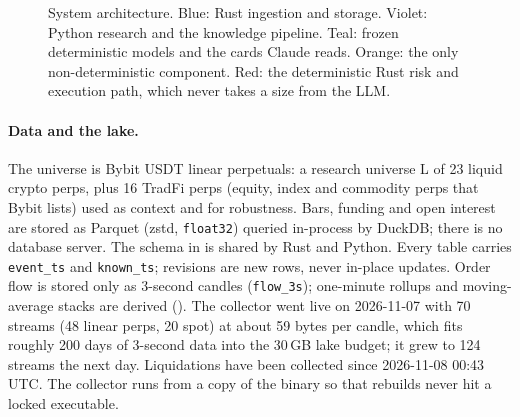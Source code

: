 \documentclass[10pt,a4paper]{article}
\begin{document}
\begin{figure}[t]
\caption{System architecture. Blue: Rust ingestion and storage. Violet: Python research and the knowledge pipeline. Teal: frozen deterministic models and the cards Claude reads. Orange: the only non-deterministic component. Red: the deterministic Rust risk and execution path, which never takes a size from the LLM.}
\label{fig:arch}
\end{figure}

\paragraph{Data and the lake.} The universe is Bybit USDT linear perpetuals: a research universe L of 23 liquid crypto perps, plus 16 TradFi perps (equity, index and commodity perps that Bybit lists) used as context and for robustness. Bars, funding and open interest are stored as Parquet (zstd, \texttt{float32}) queried in-process by DuckDB; there is no database server. The schema in \protect{} is shared by Rust and Python. Every table carries \texttt{event\_ts} and \texttt{known\_ts}; revisions are new rows, never in-place updates. Order flow is stored only as 3-second candles (\texttt{flow\_3s}); one-minute rollups and moving-average stacks are derived (\protect{}). The collector went live on 2026-11-07 with 70 streams (48 linear perps, 20 spot) at about 59 bytes per candle, which fits roughly 200 days of 3-second data into the 30\,GB lake budget; it grew to 124 streams the next day. Liquidations have been collected since 2026-11-08 00:43 UTC. The collector runs from a copy of the binary so that rebuilds never hit a locked executable.
\end{document}

